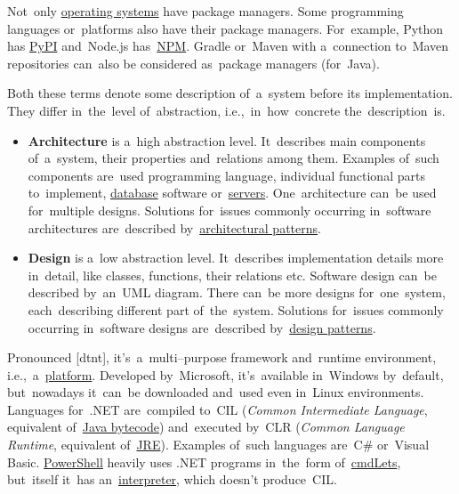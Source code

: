 Not~only \hyperref[os]{operating systems} have package managers.
Some programming languages or~platforms also have their package managers.
For~example, Python has \href{https://pypi.org/}{PyPI} and~Node.js has~\hyperref[npm]{NPM}.
Gradle or~Maven with a~connection to~Maven repositories can~also be considered as~package managers (for~Java).
\newpage

\label{architecturedesign}
Both these terms denote some description of~a~system before its implementation.
They differ in~the~level of~abstraction, i.e.,~in~how~concrete the~description~is.
\begin{itemize}
    \item \textbf{Architecture} is a~high abstraction level.
          It~describes main components of~a~system, their properties and~relations among them.
          Examples of~such components are~used programming language, individual functional parts to~implement, \hyperref[databases]{database} software or~\hyperref[server]{servers}.
          One~architecture can~be used for~multiple designs.
          Solutions for~issues commonly occurring in~software architectures are~described by~\hyperref[architecturalpatterns]{architectural patterns}.
    \item \textbf{Design} is a~low abstraction level.
          It~describes implementation details more in~detail, like classes, functions, their relations etc.
          Software design can~be described by~an~UML diagram.
          There can~be more designs for~one~system, each~describing different part of~the~system.
          Solutions for~issues commonly occurring in~software designs are~described by~\hyperref[designpatterns]{design patterns}.
\end{itemize}

\label{dotnet}
Pronounced [d\textopeno{}tn\textepsilon{}t], it's~a~multi--purpose framework and~runtime environment, i.e.,~a~\hyperref[platform]{platform}.
Developed by~Microsoft, it's~available in~Windows by~default, but~nowadays it~can~be downloaded and~used even in~Linux environments.
Languages \mbox{for~.NET} are~compiled to~CIL (\textit{Common Intermediate Language}, equivalent of~\hyperref[bytecode]{Java bytecode}) and~executed by~CLR (\textit{Common Language Runtime}, equivalent of~\hyperref[jdkjrejvm]{JRE}).
Examples of~such languages are~C\# or~Visual Basic. \hyperref[powershell]{PowerShell} heavily uses .NET programs in~the~form of~\hyperref[cmdlet]{cmdLets}, but~itself it~has an~\hyperref[compiledinterpretedlanguages]{interpreter}, which doesn't produce~CIL.

